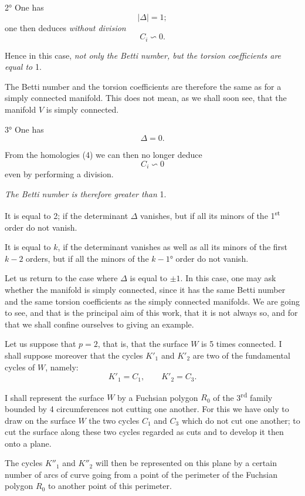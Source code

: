 \documentclass{article}
\begin{document}
2° One has
\[ |\Delta| = 1; \]
one then deduces \emph{without division}
\[ C_{i} \backsim 0. \]


Hence in this case, \emph{not only the Betti number, but the torsion coefficients are equal to} 1.

The Betti number and the torsion coefficients are therefore the same as for a simply connected manifold. This does not mean, as we shall soon see, that the manifold $V$ is simply connected.

3° One has
\[ \Delta = 0. \]

From the homologies (4) we can then no longer deduce
\[ C_{i} \backsim 0 \]
even by performing a division.

\emph{The Betti number is therefore greater than} 1.

It is equal to 2; if the determinant $\Delta$ vanishes, but if all its minors of the 1\textsuperscript{st} order do not vanish.

It is equal to $k$, if the determinant vanishes as well as all its minors of the first $k - 2$ orders, but if all the minors of the $k - 1$° order do not vanish.

Let us return to the case where $\Delta$ is equal to $\pm 1$. In this case, one may ask whether the manifold is simply connected, since it has the same Betti number and the same torsion coefficients as the simply connected manifolds. We are going to see, and that is the principal aim of this work, that it is not always so, and for that we shall confine ourselves to giving an example.

Let us suppose that $p = 2$, that is, that the surface $W$ is 5 times connected. I shall suppose moreover that the cycles $K'_{1}$ and $K'_{2}$ are two of the fundamental cycles of $W$, namely:
\[ K'_{1} = C_{1}, \qquad K'_{2} = C_{3}. \]

I shall represent the surface $W$ by a Fuchsian polygon $R_{0}$ of the 3\textsuperscript{rd} family bounded by 4 circumferences not cutting one another. For this we have only to draw on the surface $W$ the two cycles $C_{1}$ and $C_{3}$ which do not cut one another; to cut the surface along these two cycles regarded as cuts and to develop it then onto a plane.

The cycles $K''_{1}$ and $K''_{2}$ will then be represented on this plane by a certain number of arcs of curve going from a point of the perimeter of the Fuchsian polygon $R_{0}$ to another point of this perimeter.
\end{document}
